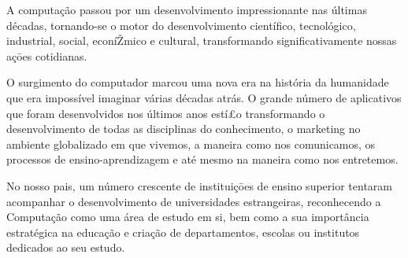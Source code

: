 A computação passou por um desenvolvimento impressionante nas últimas décadas, 
tornando-se o motor do desenvolvimento científico, tecnológico, 
industrial, social, econíŽmico e cultural, transformando significativamente 
nossas açōes cotidianas.

O surgimento do computador marcou uma nova era na história da humanidade 
que era impossível imaginar várias décadas atrás. O grande número de aplicativos 
que foram desenvolvidos nos últimos anos estí£o transformando o desenvolvimento 
de todas as disciplinas do conhecimento, o marketing no ambiente globalizado 
em que vivemos, a maneira como nos comunicamos, os processos de 
ensino-aprendizagem e até mesmo na maneira como nos entretemos.


No nosso pais, um número crescente de instituiçōes de ensino superior
tentaram acompanhar o desenvolvimento de universidades estrangeiras, reconhecendo a Computação como uma área de estudo
em si, bem como a sua importância estratégica na educação e criação de
departamentos, escolas ou institutos dedicados ao seu estudo. 